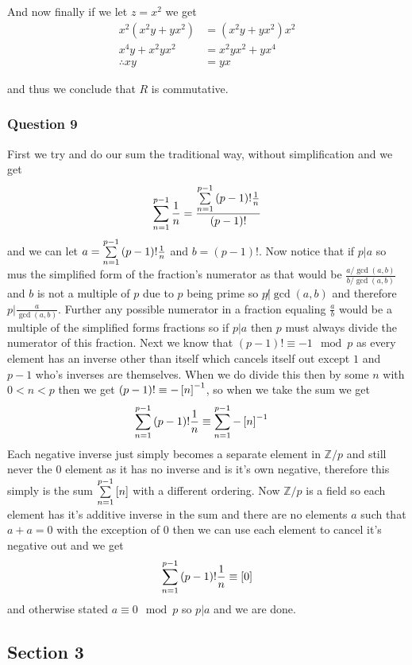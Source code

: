 \documentclass{article}
\begin{document}
And now finally if we let $z = x^2$ we get \begin{align*}
x^2(x^2y+yx^2)&=(x^2y+yx^2)x^2 \\
x^4y+x^2yx^2&= x^2yx^2+yx^4\\
\therefore xy&=yx
\end{align*}

and thus we conclude that $R$ is commutative.

\subsubsection{Question 9}
First we try and do our sum the traditional way, without simplification and we get $$\sum\limits_{n=1}^{p-1}  {\frac 1n}  = \frac{\sum\limits_{n=1}^{p-1}  {(p-1)!\frac 1n} }{(p-1)!}$$ and we can let $a = \sum\limits_{n=1}^{p-1}  {(p-1)!\frac 1n} $ and $b = (p-1)!$. Now notice that if $p|a$ so mus the simplified form of the fraction's numerator as that would be $\frac{a/\gcd(a,b)}{b/\gcd(a,b)}$ and $b$ is not a multiple of $p$ due to $p$ being prime so $p\not|\gcd(a,b)$ and therefore $p|\frac a{\gcd(a,b)}$. Further any possible numerator in a fraction equaling $\frac ab$ would be a multiple of the simplified forms fractions so if $p|a$ then $p$ must always divide the numerator of this fraction. Next we know that $(p-1)! \equiv -1\mod p$ as every element has an inverse other than itself which cancels itself out except $1$ and $p-1$ who's inverses are themselves. When we do divide this then by some $n$ with $0<n<p$ then we get $(p-1)! \equiv -\left[{n}\right]^{-1}$, so when we take the sum we get 
\begin{align*}
\sum\limits_{n=1}^{p-1}  {(p-1)!\frac 1n}  &\equiv \sum\limits_{n=1}^{p-1}  {-\left[{n}\right]^{-1}} 
\end{align*}
Each negative inverse just simply becomes a separate element in $\mathbb Z/p$ and still never the 0 element as it has no inverse and is it's own negative, therefore this simply is the sum $\sum\limits_{n=1}^{p-1}  {\left[{n}\right]} $ with a different ordering. Now $\mathbb Z/p$ is a field so each element has it's additive inverse in the sum and there are no elements $a$ such that $a+a = 0$ with the exception of $0$ then we can use each element to cancel it's negative out and we get $$\sum\limits_{n=1}^{p-1}  {(p-1)!\frac 1n}  \equiv \left[{0}\right]$$ and otherwise stated $a \equiv 0\mod p$ so $p|a$ and we are done.

\subsection{Section 3}
\end{document}
